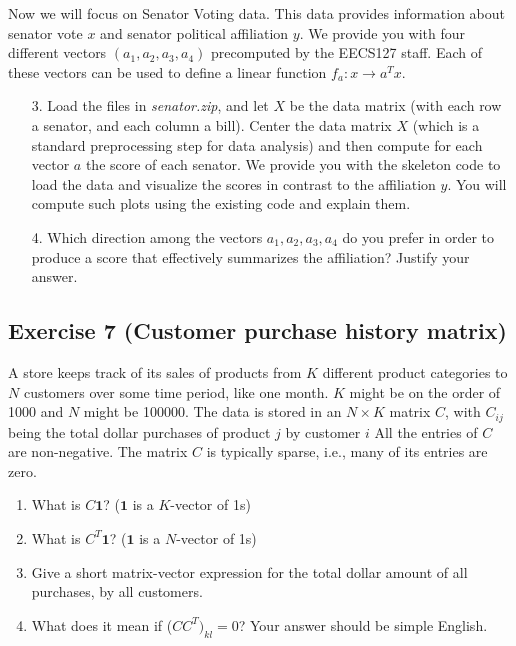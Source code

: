 \documentclass[11pt]{article}
\begin{document}
Now we will focus on Senator Voting data. This data provides information about senator vote $x$ and senator political affiliation $y$. We provide you with four different vectors $(a_1, a_2, a_3, a_4)$ precomputed by the EECS127 staff. Each of these vectors can be used to define a linear function $f_a: x \rightarrow a^Tx$.

\begin{enumerate}
    \item[3.] Load the files in \textit{senator.zip}, and let $X$ be the data matrix (with each row a senator, and each column a bill). Center the data matrix $X$ (which is a standard preprocessing step for data analysis) and then compute for each vector $a$ the score of each senator. We provide you with the skeleton code to load the data and visualize the scores in contrast to the affiliation $y$. You will compute such plots using the existing code and explain them.
    
    \item[4.] Which direction among the vectors $a_1, a_2, a_3, a_4$ do you prefer in order to produce a score that effectively summarizes the affiliation? Justify your answer.
\end{enumerate}

\begin{solution}
\end{solution}

\newpage
\subsection*{Exercise 7 (Customer purchase history matrix)}

A store keeps track of its sales of products from $K$ different
product categories to $N$ customers over some time period, like one month. $K$ might be on the order of 1000 and $N$ might be 100000. The data is stored in an $N \times K$ matrix $C$, with $C_{ij}$ being the total dollar purchases of product $j$ by customer $i$ All the entries of $C$ are non-negative. The matrix $C$ is typically sparse, i.e., many of its entries are zero.

\begin{enumerate}
    \item What is $C \boldsymbol{1}$? ($\boldsymbol{1}$ is a $K$-vector of 1s)
    
    \item What is $C^T \boldsymbol{1}$? ($\boldsymbol{1}$ is a $N$-vector of 1s)
    
    \item Give a short matrix-vector expression for the total dollar amount of all purchases, by all customers.
    
    \item What does it mean if ($CC^T)_{kl} = 0$? Your answer should be simple English.
\end{enumerate}
\end{document}
